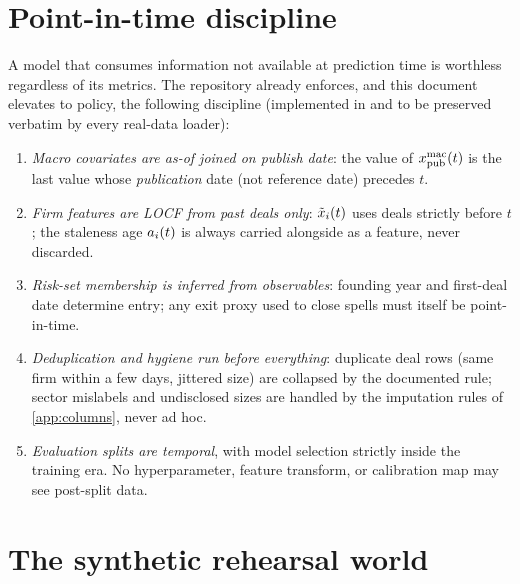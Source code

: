 \section{Point-in-time discipline}\label{ch02:sec:pit}

A model that consumes information not available at prediction time is
worthless regardless of its metrics. The repository already enforces, and
this document elevates to policy, the following discipline (implemented in
 and to be preserved verbatim by every real-data
loader):

\begin{protocol}\label{prot:ch02:pit}
\leavevmode
\begin{enumerate}[label=(\alph*)]
\item \emph{Macro covariates are as-of joined on publish date}: the value
of $x^{\mathrm{mac}}_{\mathrm{pub}}(t)$ is the last value whose
\emph{publication} date (not reference date) precedes $t$.
\item \emph{Firm features are LOCF from past deals only}: $\tilde{x}_i(t)$
uses deals strictly before $t$; the staleness age $a_i(t)$ is
always carried alongside as a feature, never discarded.
\item \emph{Risk-set membership is inferred from observables}: founding
year and first-deal date determine entry; any exit proxy used to close
spells must itself be point-in-time.
\item \emph{Deduplication and hygiene run before everything}: duplicate
deal rows (same firm within a few days, jittered size) are collapsed by
the documented rule; sector mislabels and undisclosed sizes are handled by
the imputation rules of \cref{app:columns}, never ad hoc.
\item \emph{Evaluation splits are temporal}, with model selection strictly
inside the training era. No hyperparameter, feature transform, or
calibration map may see post-split data.
\end{enumerate}
\end{protocol}

\section{The synthetic rehearsal world}\label{ch02:sec:synthetic}

